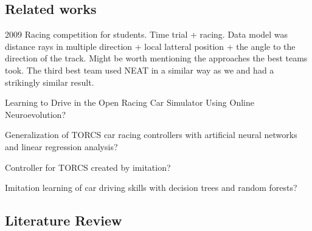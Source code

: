 

\subsection{Related works}

2009 Racing competition \cite{racingChamp2009} for students. Time trial + racing. Data model was distance rays in multiple direction + local latteral position + the angle to the direction of the track. Might be worth mentioning the approaches the best teams took. The third best team used NEAT in a similar way as we and had a strikingly similar result.

Learning to Drive in the Open Racing Car Simulator Using Online Neuroevolution?

Generalization of TORCS car racing controllers with artificial neural networks and linear regression analysis?

Controller for TORCS created by imitation?

Imitation learning of car driving skills with decision trees and random forests?

\subsection{Literature Review}


